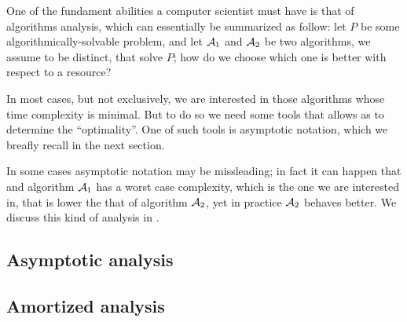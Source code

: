 \documentclass{subfiles}
\begin{document}
    One of the fundament abilities a computer scientist must have is that of algorithms analysis,
        which can essentially be summarized as follow: let \(P\) be some algorithmically-solvable problem, 
        and let \(\mathcal{A}_{1}\) and \(\mathcal{A}_{2}\) be two algorithms, we assume to be distinct,
        that solve \(P\); how do we choose which one is better with respect to a resource?
        
    In most cases, but not exclusively, we are interested in those algorithms whose 
        time complexity is minimal. But to do so we need some tools that allows as 
        to determine the ``optimality''. One of such tools is asymptotic notation, 
        which we breafly recall in the next section.

    In some cases asymptotic notation may be missleading; in fact it can happen 
        that and algorithm \(\mathcal{A}_{1}\) has a worst case complexity, 
        which is the one we are interested in, that is lower the that of algorithm \(\mathcal{A}_{2}\),
        yet in practice \(\mathcal{A}_{2}\) behaves better. We discuss this kind of analysis in .

    \subsection{Asymptotic analysis}
    

    \subsection{Amortized analysis}
    
\end{document}

